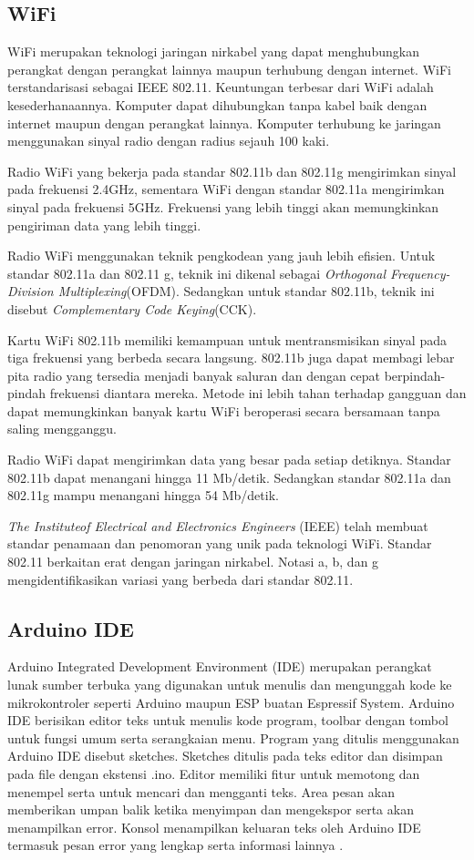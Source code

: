 \subsection{WiFi}

WiFi merupakan teknologi jaringan nirkabel yang dapat menghubungkan perangkat dengan perangkat lainnya maupun terhubung dengan internet. WiFi terstandarisasi sebagai IEEE 802.11. Keuntungan terbesar dari WiFi adalah kesederhanaannya. Komputer dapat dihubungkan tanpa kabel baik dengan internet maupun dengan perangkat lainnya. Komputer terhubung ke jaringan menggunakan sinyal radio dengan radius sejauh 100 kaki. 

Radio WiFi yang bekerja pada standar 802.11b dan 802.11g mengirimkan sinyal pada frekuensi 2.4GHz, sementara WiFi dengan standar 802.11a mengirimkan sinyal pada frekuensi 5GHz. Frekuensi yang lebih tinggi akan memungkinkan pengiriman data yang lebih tinggi.

Radio WiFi menggunakan teknik pengkodean yang jauh lebih efisien. Untuk standar 802.11a dan 802.11 g, teknik ini dikenal sebagai \emph{Orthogonal Frequency-Division Multiplexing}(OFDM). Sedangkan untuk standar 802.11b, teknik ini disebut \emph{Complementary Code Keying}(CCK).

Kartu WiFi 802.11b memiliki kemampuan untuk mentransmisikan sinyal pada tiga frekuensi yang berbeda secara langsung. 802.11b juga dapat membagi lebar pita radio yang tersedia menjadi banyak saluran dan dengan cepat berpindah-pindah frekuensi diantara mereka. Metode ini lebih tahan terhadap gangguan dan dapat memungkinkan banyak kartu WiFi beroperasi secara bersamaan tanpa saling mengganggu.

Radio WiFi dapat mengirimkan data yang besar pada setiap detiknya. Standar 802.11b dapat menangani hingga 11 Mb/detik. Sedangkan standar 802.11a dan 802.11g mampu menangani hingga 54 Mb/detik.

\emph{The Instituteof Electrical and Electronics Engineers} (IEEE) telah membuat standar penamaan dan penomoran yang unik pada teknologi WiFi. Standar 802.11 berkaitan erat dengan jaringan nirkabel. Notasi a, b, dan g mengidentifikasikan variasi yang berbeda dari standar 802.11. 

\subsection{Arduino IDE}

Arduino Integrated Development Environment (IDE) merupakan perangkat lunak sumber terbuka yang digunakan untuk menulis dan mengunggah kode ke mikrokontroler seperti Arduino maupun ESP buatan Espressif System. Arduino IDE berisikan editor teks untuk menulis kode program, toolbar dengan tombol untuk fungsi umum serta serangkaian menu. Program yang ditulis menggunakan Arduino IDE disebut sketches. Sketches ditulis 
pada teks editor dan disimpan pada file dengan ekstensi .ino. Editor memiliki fitur untuk memotong dan menempel serta untuk mencari dan mengganti teks. Area pesan akan memberikan umpan balik ketika menyimpan dan mengekspor serta akan menampilkan error. Konsol menampilkan keluaran teks oleh Arduino IDE termasuk pesan error yang lengkap serta informasi lainnya \parencite{Söderby_Hylén_2023a}.

